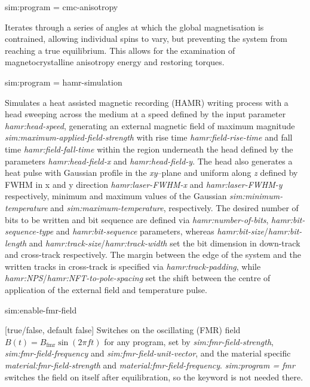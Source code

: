{\zicf sim:program = cmc-anisotropy} Iterates through a series of angles at which the global magnetisation is contrained, allowing individual spins to vary, but preventing the system from reaching a true equilibrium. This allows for the examination of magnetocrystalline anisotropy energy and restoring torques.

{\zicf sim:program = hamr-simulation}
Simulates a heat assisted magnetic recording (HAMR) writing process with a head sweeping across the medium at a speed
defined by the input parameter \textit{hamr:head-speed}, generating an external magnetic field of maximum magnitude
\textit{sim:maximum-applied-field-strength} with rise time \textit{hamr:field-rise-time} and fall time \textit{hamr:field-fall-time}
within the region underneath the head defined by the parameters \textit{hamr:head-field-x} and \textit{hamr:head-field-y}.
The head also generates a heat pulse with Gaussian profile in the \textit{xy}--plane and uniform along \textit{z}
defined by FWHM in x and y direction \textit{hamr:laser-FWHM-x} and \textit{hamr:laser-FWHM-y} respectively,
minimum and maximum values of the Gaussian \textit{sim:minimum-temperature} and \textit{sim:maximum-temperature}, respectively.
The desired number of bits to be written and bit sequence are defined via
\textit{hamr:number-of-bits}, \textit{hamr:bit-sequence-type} and \textit{hamr:bit-sequence} parameters, whereas
\textit{hamr:bit-size}/\textit{hamr:bit-length} and \textit{hamr:track-size}/\textit{hamr:track-width} set the bit
dimension in down-track and cross-track respectively.
The margin between the edge of the system and the written tracks in cross-track is specified via
\textit{hamr:track-padding}, while \textit{hamr:NPS}/\textit{hamr:NFT-to-pole-spacing}
set the shift between the centre of application of the external field and temperature pulse.

{\zicf sim:enable-fmr-field} [true/false, default false] Switches on the oscillating (FMR) field $B(t) = B_{\mathrm{fmr}} \sin(2 \pi f t)$ for any program, set by \textit{sim:fmr-field-strength}, \textit{sim:fmr-field-frequency} and \textit{sim:fmr-field-unit-vector}, and the material specific \textit{material:fmr-field-strength} and \textit{material:fmr-field-frequency}. \textit{sim:program = fmr} switches the field on itself after equilibration, so the keyword is not needed there.

